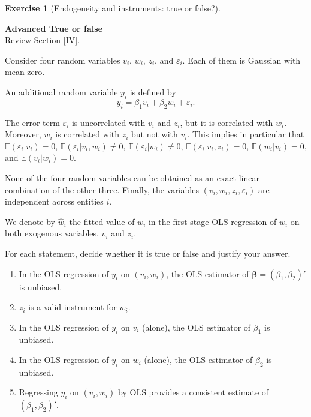 \documentclass[
  11pt,
]{book}
\theoremstyle{definition}
\theoremstyle{definition}
\theoremstyle{definition}
\newtheorem{exercise}{Exercise}[chapter]
\theoremstyle{definition}
\theoremstyle{remark}
\begin{document}

\begin{exercisebox}

\begin{exercise}[Endogeneity and instruments: true or false?]
\protect\hypertarget{exr:regressions-instrumental-variables-true-false}{}\label{exr:regressions-instrumental-variables-true-false}

\textbf{Advanced \textbar{} True or false}\\
Review Section \ref{IV}.

Consider four random variables \(v_i\), \(w_i\), \(z_i\), and \(\varepsilon_i\). Each of them is Gaussian with mean zero.

An additional random variable \(y_i\) is defined by \[y_i=\beta_1 v_i+\beta_2 w_i+\varepsilon_i.\]

The error term \(\varepsilon_i\) is uncorrelated with \(v_i\) and \(z_i\), but it is correlated with \(w_i\). Moreover, \(w_i\) is correlated with \(z_i\) but not with \(v_i\). This implies in particular that \(\mathbb{E}(\varepsilon_i|v_i)=0\), \(\mathbb{E}(\varepsilon_i|v_i,w_i)\neq 0\), \(\mathbb{E}(\varepsilon_i|w_i)\neq 0\), \(\mathbb{E}(\varepsilon_i|v_i,z_i)=0\), \(\mathbb{E}(w_i|v_i)=0\), and \(\mathbb{E}(v_i|w_i)=0\).

None of the four random variables can be obtained as an exact linear combination of the other three. Finally, the variables \((v_i,w_i,z_i,\varepsilon_i)\) are independent across entities \(i\).

We denote by \(\hat{w}_i\) the fitted value of \(w_i\) in the first-stage OLS regression of \(w_i\) on both exogenous variables, \(v_i\) and \(z_i\).

For each statement, decide whether it is true or false and justify your answer.

\begin{enumerate}
\def\labelenumi{\arabic{enumi}.}
\item
  In the OLS regression of \(y_i\) on \((v_i,w_i)\), the OLS estimator of \(\boldsymbol\beta=(\beta_1,\beta_2)'\) is unbiased.
\item
  \(z_i\) is a valid instrument for \(w_i\).
\item
  In the OLS regression of \(y_i\) on \(v_i\) (alone), the OLS estimator of \(\beta_1\) is unbiased.
\item
  In the OLS regression of \(y_i\) on \(w_i\) (alone), the OLS estimator of \(\beta_2\) is unbiased.
\item
  Regressing \(y_i\) on \((v_i,\hat{w}_i)\) by OLS provides a consistent estimate of \((\beta_1,\beta_2)'\).
\end{enumerate}

\end{exercise}

\end{exercisebox}
\end{document}
